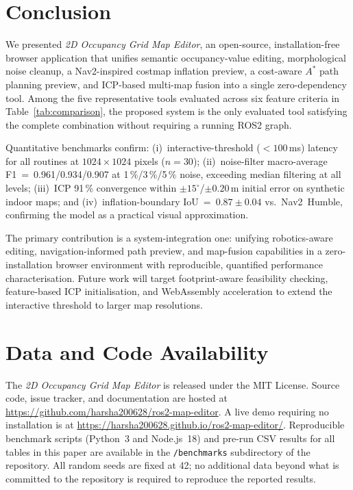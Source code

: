 \documentclass[journal]{IEEEtran}
\begin{document}
\section{Conclusion}
\label{sec:conclusion}

We presented \emph{2D Occupancy Grid Map Editor}, an open-source, installation-free browser
application that unifies semantic occupancy-value editing, morphological noise
cleanup, a Nav2-inspired costmap inflation preview, a cost-aware $A^{*}$ path
planning preview, and ICP-based multi-map fusion into a single zero-dependency
tool.  Among the five representative tools evaluated across six feature
criteria in Table~\ref{tab:comparison}, the proposed system is the only
evaluated tool satisfying the complete combination without requiring a running
ROS2 graph.

Quantitative benchmarks confirm: (i)~interactive-threshold ($<\!100$\,ms)
latency for all routines at $1024\times1024$ pixels ($n=30$);
(ii)~noise-filter macro-average F1~=~0.961/0.934/0.907 at 1\,\%/3\,\%/5\,\%
noise, exceeding median filtering at all levels; (iii)~ICP 91\,\% convergence
within $\pm15^{\circ}$/$\pm0.20$\,m initial error on synthetic indoor maps;
and (iv)~inflation-boundary IoU~=~$0.87\pm0.04$ vs.\ Nav2~Humble, confirming
the model as a practical visual approximation.

The primary contribution is a system-integration one: unifying robotics-aware
editing, navigation-informed path preview, and map-fusion capabilities in a
zero-installation browser environment with reproducible, quantified performance
characterisation.  Future work will target footprint-aware feasibility
checking, feature-based ICP initialisation, and WebAssembly acceleration to
extend the interactive threshold to larger map resolutions.

\section*{Data and Code Availability}

The \emph{2D Occupancy Grid Map Editor} is released under the MIT License.
Source code, issue tracker, and documentation are hosted at
\url{https://github.com/harsha200628/ros2-map-editor}.
A live demo requiring no installation is at
\url{https://harsha200628.github.io/ros2-map-editor/}.
Reproducible benchmark scripts (Python~3 and Node.js~18) and pre-run CSV
results for all tables in this paper are available in the
\texttt{/benchmarks} subdirectory of the repository.  All random seeds are
fixed at 42; no additional data beyond what is committed to the repository
is required to reproduce the reported results.
\end{document}

